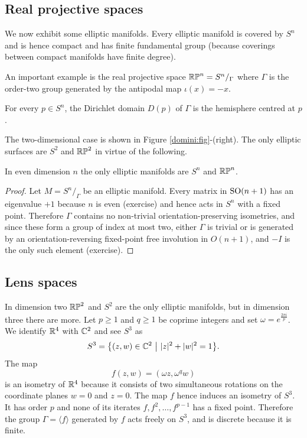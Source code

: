 \subsection{Real projective spaces} 
We now exhibit some elliptic manifolds. Every elliptic manifold is covered by $S^n$ and is hence compact and has finite fundamental group (because coverings between compact manifolds have finite degree). 

An important example is the real projective space $\mathbb{RP}^n = S^n/_\Gamma$ where $\Gamma$ is the order-two group generated by the antipodal map $\iota (x) = -x$. 

\begin{ex}
For every $p\in S^n$, the Dirichlet domain $D(p)$ of $\Gamma$ is the hemisphere centred at $p$.
\end{ex}
The two-dimensional case is shown in Figure \ref{domini:fig}-(right). The only elliptic surfaces are $S^2$ and $\mathbb{RP}^2$ in virtue of the following.
\begin{prop}
In even dimension $n$ the only elliptic manifolds are $S^n$ and $\mathbb{RP}^n$.
\end{prop}
\begin{proof}
Let $M=S^n/_\Gamma$ be an elliptic manifold. Every matrix in ${\rm SO}(n+1)$ has an eigenvalue $+1$ because $n$ is even (exercise) and hence acts in $S^n$ with a fixed point. Therefore $\Gamma$ contains no non-trivial orientation-preserving isometries, and since these form a group of index at most two, either $\Gamma$ is trivial or is generated by an orientation-reversing fixed-point free involution in $O(n+1)$, and $-I$ is the only such element (exercise).
\end{proof}

\subsection{Lens spaces} \label{lens:subsection}
In dimension two $\mathbb{RP}^2$ and $S^2$ are the only elliptic manifolds, but in dimension three there are more. Let $p\geqslant 1$ and $q\geqslant 1$ be coprime integers and set $\omega = e^{\frac{2\pi i}p}$. We identify $\mathbb{R}^4$ with $\mathbb{C}^2$ and see $S^3$ as
$$S^3 = \big\{(z,w)\in \matC^2\ \big|\ |z|^2+|w|^2 = 1 \big\}.$$
The map
$$f(z,w) = (\omega z, \omega^qw)$$
is an isometry of $\mathbb{R}^4$ because it consists of two simultaneous rotations on the coordinate planes $w=0$ and $z=0$. The map $f$ hence induces an isometry of $S^3$. It has order $p$ and none of its iterates $f, f^2, \ldots, f^{p-1}$ has a fixed point. Therefore the group $\Gamma = \langle f \rangle$ generated by $f$ acts freely on $S^3$, and is discrete because it is finite.  

